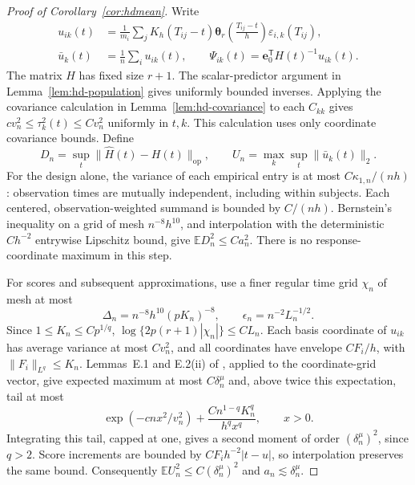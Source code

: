 \documentclass[12pt]{article}
\newcommand{\be}{{\mathbf e}}
\newcommand{\btheta}  {\boldsymbol{\theta}}
\newcommand{\expect}{\mathbb{E}}
\newcommand{\trans}{{\scriptscriptstyle\mathsf{T}}}
\numberwithin{equation}{section}
\begin{document}
\begin{proof}[Proof of Corollary~\ref{cor:hdmean}]
Write
\[
\begin{aligned}
u_{ik}(t)&=\frac1{m_i}\sum_j K_h(T_{ij}-t)
\btheta_r\!\left(\frac{T_{ij}-t}{h}\right)\varepsilon_{i,k}(T_{ij}),\\
\bar u_k(t)&=\frac1n\sum_i u_{ik}(t),\qquad
\Psi_{ik}(t)=\be_0^\trans H(t)^{-1}u_{ik}(t).
\end{aligned}
\]
The matrix $H$ has fixed size $r+1$. The scalar-predictor argument in
Lemma~\ref{lem:hd-population} gives uniformly bounded inverses.
Applying the covariance calculation in Lemma~\ref{lem:hd-covariance}
to each $C_{kk}$ gives
$cv_n^2\le\tau_k^2(t)\le Cv_n^2$ uniformly in $t,k$.
This calculation uses only coordinate covariance bounds.
Define
\[
D_n=\sup_t\|\widehat H(t)-H(t)\|_{\mathrm{op}},
\qquad U_n=\max_k\sup_t\|\bar u_k(t)\|_2 .
\]
For the design alone, the variance of each empirical entry is at most
$C\kappa_{1,n}/(nh)$: observation times are mutually independent,
including within subjects. Each centered, observation-weighted summand
is bounded by $C/(nh)$. Bernstein's inequality on a grid of mesh
$n^{-8}h^{10}$, and interpolation with the deterministic $Ch^{-2}$
entrywise Lipschitz bound, give
$\expect D_n^2\le Ca_n^2$. There is no response-coordinate maximum
in this step.

For scores and subsequent approximations, use a finer regular time grid
$\chi_n$ of mesh at most
\[
\Delta_n=n^{-8}h^{10}(pK_n)^{-8},\qquad
\epsilon_n=n^{-2}L_n^{-1/2}.
\]
Since $1\le K_n\le Cp^{1/q}$,
$\log\{2p(r+1)|\chi_n|\}\le CL_n$.
Each basis coordinate of $u_{ik}$ has average variance at most
$Cv_n^2$, and all coordinates have envelope $CF_i/h$, with
$\|F_i\|_{L^q}\le K_n$. Lemmas~E.1 and E.2(ii) of
\citet{chernozhukov_central_2017}, applied to the coordinate-grid
vector, give expected maximum at most $C\delta_n^\mu$ and, above
twice this expectation, tail at most
\[
\exp(-cnx^2/v_n^2)+
\frac{Cn^{1-q}K_n^q}{h^q x^q},\qquad x>0.
\]
Integrating this tail, capped at one, gives a second moment of order
$(\delta_n^\mu)^2$, since $q>2$. Score increments are bounded by
$CF_i h^{-2}|t-u|$, so interpolation preserves the same bound.
Consequently $\expect U_n^2\le C(\delta_n^\mu)^2$ and
$a_n\lesssim\delta_n^\mu$.


\end{proof}
\end{document}
